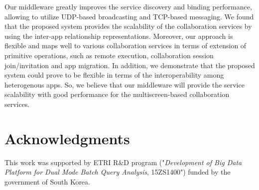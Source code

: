 \documentclass[conference]{IEEEtran}
\begin{document}
Our middleware greatly improves the service discovery and binding performance, allowing to utilize UDP-based broadcasting and TCP-based messaging.
We found that the proposed system provides the scalability of the collaboration services by using the inter-app relationship representations.
Moreover, our approach is flexible and maps well to various collaboration services in terms of extension of primitive operations, such as remote execution, collaboration session join/invitation and app migration.
In addition, we demonstrate that the proposed system could prove to be flexible in terms of the interoperability among heterogenous apps. 
So, we believe that our middleware will provide the service scalability with good performance for the multiscreen-based collaboration services.

\section*{Acknowledgments}
This work was supported by ETRI R\&D program ("\textit{Development of Big Data Platform for Dual Mode Batch Query Analysis}, 15ZS1400") funded by the government of South Korea.


\end{document}
